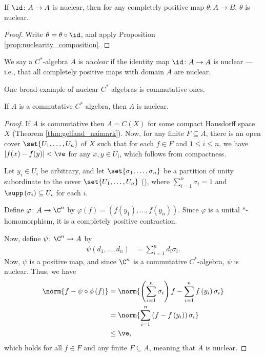 \begin{corollary}
  If $\id\colon A\rightarrow A$ is nuclear, then for any completely positive map $\theta\colon A\rightarrow B$, $\theta$ is nuclear.
\end{corollary}
\begin{proof}
  Write $\theta = \theta\circ \id$, and apply Proposition \ref{prop:nuclearity_composition}.
\end{proof}
\begin{definition}
  We say a $C^{\ast}$-algebra $A$ is \textit{nuclear} if the identity map $\id\colon A\rightarrow A$ is nuclear --- i.e., that all completely positive maps with domain $A$ are nuclear.
\end{definition}
One broad example of nuclear $C^{\ast}$-algebras is commutative ones.
\begin{proposition}
  If $A$ is a commutative $C^{\ast}$-algebra, then $A$ is nuclear.
\end{proposition}
\begin{proof}
  If $A$ is commutative then $A = C\left( X \right)$ for some compact Hausdorff space $X$ (Theorem \ref{thm:gelfand_naimark}). Now, for any finite $F\subseteq A$, there is an open cover $\set{U_1,\dots,U_n}$ of $X$ such that for each $f\in F$ and $1 \leq i \leq n$, we have $\left\vert f(x) - f(y) \right\vert < \ve$ for any $x,y\in U_i$, which follows from compactness.\newline

  Let $y_i\in U_i$ be arbitrary, and let $\set{\sigma_1,\dots,\sigma_n}$ be a partition of unity subordinate to the cover $\set{U_1,\dots,U_n}$ (\cite[Proposition 4.41]{folland_real_analysis}), where $\sum_{i=1}^{n}\sigma_i = 1$ and $\supp\left( \sigma_i \right) \subseteq U_i$ for each $i$.\newline

  Define $\varphi\colon A\rightarrow \C^n$ by $\varphi\left( f \right) = \left( f\left(y_1\right),\dots,f\left( y_n \right) \right)$. Since $\varphi$ is a unital $\ast$-homomorphism, it is a completely positive contraction.\newline

  Now, define $\psi\colon \C^n\rightarrow A$ by
  \begin{align*}
    \psi\left( d_1,\dots,d_n \right) &= \sum_{i=1}^{n}d_i\sigma_i.
  \end{align*}
  Now, $\psi$ is a positive map, and since $\C^n$ is a commutative $C^{\ast}$-algebra, $\psi$ is nuclear. Thus, we have
  \begin{align*}
    \norm{f - \psi\circ\phi\left( f \right)} &= \norm{\left( \sum_{i=1}^{n}\sigma_i \right)f - \sum_{i=1}^{n}f\left( y_i \right)\sigma_i}\\
                                             &= \norm{\sum_{i=1}^{n}\left( f-f\left( y_i \right) \right)\sigma_i}\\
                                             &\leq \ve,
  \end{align*}
  which holds for all $f\in F$ and any finite $F\subseteq A$, meaning that $A$ is nuclear.
\end{proof}
